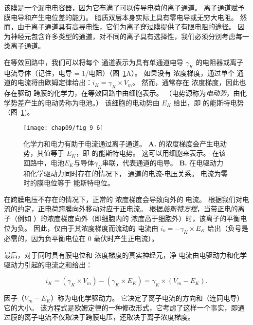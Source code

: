 该膜是一个漏电电容器，因为它布满了可以传导电荷的离子通道。
离子通道赋予膜电导和产生电位差的能力。
脂质双层本身实际上具有零电导或无穷大电阻。
然而，由于离子通道具有高导电性，它们为离子穿过膜提供了有限电阻的途径。
因为神经元包含许多类型的通道，对不同的离子具有选择性，我们必须分别考虑每一类离子通道。


在等效回路中，我们可以将每个  通道表示为具有单通道电导 $\gamma_K$ 的电阻器或离子电流导体（记住，电导 = 1/电阻）（图~\ref{fig:9_6}A）。 
如果没有  浓度梯度，通过单个  通道的电流将由欧姆定律给出：$i_K = \gamma_K \times V_m$。
然而，通常存在  浓度梯度，因此也存在驱动  跨膜的化学力，在等效回路中由细胞表示。
（电势源称为\textit{电动势}，由化学势差产生的电动势称为电池。）
该细胞的电动势由 $E_K$ 给出，即  的能斯特电势（图~\ref{fig:9_6})。


\begin{figure}[htbp]
	\centering
	\texttt{[image: chap09/fig\_9\_6]}
	\caption{化学力和电力有助于电流通过离子通道。
		\textbf{A.}  的浓度梯度会产生电动势，其值等于 $E_K$，即  的能斯特电势。
		这可以用细胞来表示。 在该回路中，电池$E_K$与导体$\gamma_K$串联，代表通道的电导。
		\textbf{B.} 在电驱动力和化学驱动力同时存在的情况下， 通道的电流-电压关系。
		电流为零时的膜电位等于  能斯特电位。}
	\label{fig:9_6}
\end{figure}


在跨膜电压不存在的情况下，正常的  浓度梯度会导致向外的  电流。
根据我们对电流的约定，正电荷跨膜向外移动对应于正电流。
根据\textit{能斯特方程}，当带正电的离子（例如 ）的浓度梯度向外（即细胞内的  浓度高于细胞外）时，该离子的平衡电位为负。
因此，仅由于其浓度梯度而流动的  电流由 $i_k = -\gamma_K \times E_K$ 给出（负号是必需的，因为负平衡电位在 0 毫伏时产生正电流）。


最后，对于同时具有膜电位和  浓度梯度的真实神经元，净  电流由电驱动力和化学驱动力引起的电流之和给出：

\begin{equation}
	i_K = (\gamma_K \times V_m) - 
		(\gamma_K \times E_K) =
		\gamma_K \times (V_m - E_K).
\end{equation}


因子（$V_m - E_K$）称为电化学驱动力。
它决定了离子电流的方向和（连同电导）它的大小。
该方程式是欧姆定律的一种修改形式，它考虑了这样一个事实，即通过膜的离子电流不仅取决于跨膜电压，还取决于离子浓度梯度。


